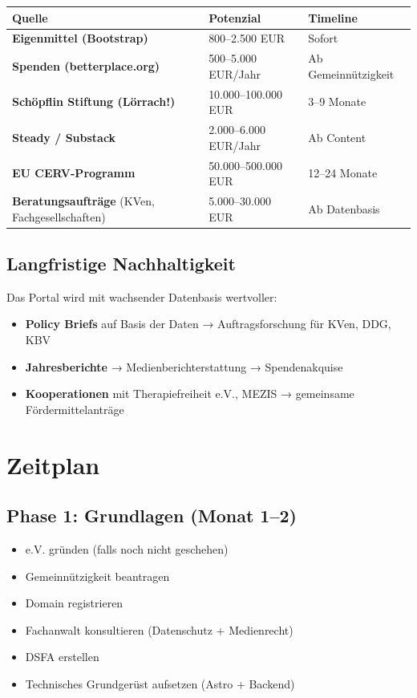 \documentclass{umbruch-position}
\begin{document}
{\small
\begin{tabularx}{\textwidth}{X X X}
\toprule
\textbf{Quelle} & \textbf{Potenzial} & \textbf{Timeline} \\
\midrule
\textbf{Eigenmittel (Bootstrap)} & 800–2.500 EUR & Sofort \\
\textbf{Spenden (betterplace.org)} & 500–5.000 EUR/Jahr & Ab Gemeinnützigkeit \\
\textbf{Schöpflin Stiftung (Lörrach!)} & 10.000–100.000 EUR & 3–9 Monate \\
\textbf{Steady / Substack} & 2.000–6.000 EUR/Jahr & Ab Content \\
\textbf{EU CERV-Programm} & 50.000–500.000 EUR & 12–24 Monate \\
\textbf{Beratungsaufträge} (KVen, Fachgesellschaften) & 5.000–30.000 EUR & Ab Datenbasis \\
\bottomrule
\end{tabularx}
}


\subsection{Langfristige Nachhaltigkeit}

Das Portal wird mit wachsender Datenbasis wertvoller:
\begin{itemize}[nosep]
  \item \textbf{Policy Briefs} auf Basis der Daten → Auftragsforschung für KVen, DDG, KBV
  \item \textbf{Jahresberichte} → Medienberichterstattung → Spendenakquise
  \item \textbf{Kooperationen} mit Therapiefreiheit e.V., MEZIS → gemeinsame Fördermittelanträge
\end{itemize}


\section{Zeitplan}

\subsection{Phase 1: Grundlagen (Monat 1–2)}

\begin{itemize}[nosep]
  \item [{[ ]}] e.V. gründen (falls noch nicht geschehen)
  \item [{[ ]}] Gemeinnützigkeit beantragen
  \item [{[ ]}] Domain registrieren
  \item [{[ ]}] Fachanwalt konsultieren (Datenschutz + Medienrecht)
  \item [{[ ]}] DSFA erstellen
  \item [{[ ]}] Technisches Grundgerüst aufsetzen (Astro + Backend)
\end{itemize}
\end{document}
